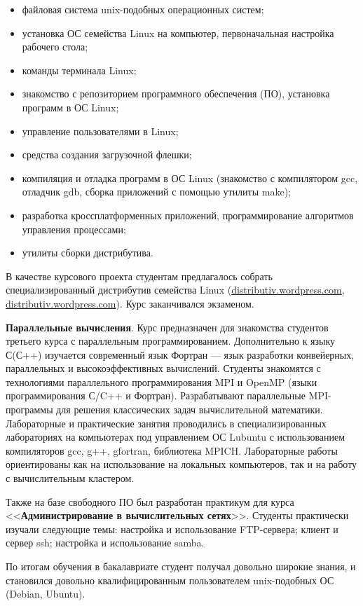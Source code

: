 \documentclass[10pt, a5paper]{article}
\begin{document}
\begin{itemize}
  \item файловая система unix-подобных операционных систем;
  \item установка ОС семейства Linux на компьютер, первоначальная настройка рабочего стола;
  \item команды терминала Linux;
  \item знакомство с репозиторием программного обеспечения (ПО), установка программ в ОС Linux;
  \item управление пользователями в Linux;
  \item средства создания загрузочной флешки;
  \item компиляция и отладка программ в ОС Linux (знакомство с компилятором gcc, отладчик gdb, сборка приложений с помощью утилиты make);
  \item разработка кроссплатформенных приложений, программирование алгоритмов управления процессами;
  \item утилиты сборки дистрибутива.
\end{itemize}

В качестве курсового проекта студентам предлагалось собрать специализированный дистрибутив семейства Linux (\url{distributiv.wordpress.com}, \url{distributiv.wordpress.com}). Курс заканчивался экзаменом.

\textbf{Параллельные вычисления}. Курс предназначен для знакомства студентов третьего курса с параллельным программированием. Дополнительно к языку С(С++) изучается современный язык Фортран --- язык разработки конвейерных, параллельных и высокоэффективных вычислений. Студенты знакомятся с технологиями параллельного программирования MPI и OpenMP (языки программирования С/C++ и Фортран). Разрабатывают параллельные MPI-программы для решения классических задач вычислительной математики. Лабораторные и практические занятия проводились в специализированных лабораториях на компьютерах под управлением ОС Lubuntu с использованием компиляторов gcc, g++, gfortran, библиотека MPICH. Лабораторные работы ориентированы как на использование на локальных компьютеров, так и на работу с вычислительным кластером.

Также на базе свободного ПО был разработан практикум для курса <<\textbf{Администрирование в вычислительных сетях}>>. Студенты практически изучали следующие темы: настройка и использование FTP-сервера; клиент и сервер ssh; настройка и использование samba.

По итогам обучения в бакалавриате студент получал довольно широкие знания, и становился довольно квалифицированным пользователем unix-подобных ОС (Debian, Ubuntu).
\end{document}
